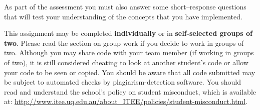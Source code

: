 As part of the assessment you must also answer some short--response questions
that will test your understanding of the concepts that you have implemented.

This assignment may be completed \textbf{individually} or in
\textbf{self-selected groups of two}. Please read the section on group work if
you decide to work in groups of two. Although you may share code with your team
member (if working in groups of two), it is still considered cheating to look
at another student's code or allow your code to be seen or copied. You should
be aware that all code submitted may be subject to automated checks by
plagiarism-detection software.  You should read and understand the school's
policy on student misconduct, which is available at:
\url{http://www.itee.uq.edu.au/about_ITEE/policies/student-misconduct.html}.
